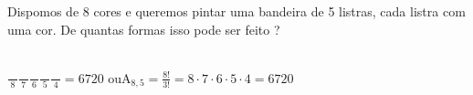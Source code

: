 \begin{ex}
 Dispomos de 8 cores e queremos pintar uma bandeira de 5 listras, cada listra com uma cor. De quantas formas isso pode ser feito ?
  \begin{sol}
      \phantom{A} \\
  $\frac{\phantom{10}}{8}\frac{\phantom{10}}{7}\frac{\phantom{10}}{6}\frac{\phantom{10}}{5}\frac{\phantom{10}}{4}=6720$ ou\hspace{0,2cm}$\mathrm{A}_{8,5}=\frac{8!}{3!}= 8\cdot7\cdot6\cdot5\cdot4=6720$
  \end{sol}
\end{ex}